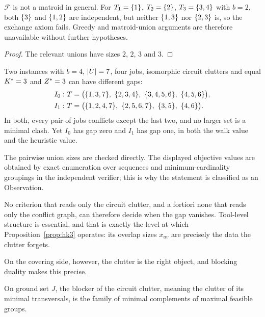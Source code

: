 \begin{proposition}\label{prop:nonmatroid}
$\mathcal{F}$ is not a matroid in general. For $T_1=\{1\}$, $T_2=\{2\}$,
$T_3=\{3,4\}$ with $b=2$, both $\{3\}$ and $\{1,2\}$ are independent, but
neither $\{1,3\}$ nor $\{2,3\}$ is, so the exchange axiom fails. Greedy and
matroid-union arguments are therefore unavailable without further hypotheses.
\end{proposition}

\begin{proof}
The relevant unions have sizes $2$, $2$, $3$ and $3$.
\end{proof}

\begin{observation}\label{obs:noclutter}
Two instances with $b=4$, $\lvert U\rvert=7$, four jobs, isomorphic circuit clutters
and equal $K^{\ast}=3$ and $Z^{\ast}=3$ can have different gaps:
\[
\begin{aligned}
  I_0:\ &T=\bigl(\rset{1,3,7},\ \rset{2,3,4},\ \rset{3,4,5,6},\ \rset{4,5,6}\bigr),\\
  I_1:\ &T=\bigl(\rset{1,2,4,7},\ \rset{2,5,6,7},\ \rset{3,5},\ \rset{4,6}\bigr).
\end{aligned}
\]
In both, every pair of jobs conflicts except the last two, and no larger set is a
minimal clash. Yet $I_0$ has gap zero and $I_1$ has gap one, in both the walk value
and the heuristic value.
\end{observation}

The pairwise union sizes are checked directly. The displayed objective values are
obtained by exact enumeration over sequences and minimum-cardinality groupings in
the independent verifier; this is why the statement is classified as an Observation.

No criterion that reads only the circuit clutter, and a fortiori none that reads only
the conflict graph, can therefore decide when the gap vanishes. Tool-level structure
is essential, and that is exactly the level at which Proposition~\ref{prop:hk3}
operates: its overlap sizes $x_{uv}$ are precisely the data the clutter forgets.

On the covering side, however, the clutter is the right object, and blocking duality
makes this precise.

\begin{proposition}\label{prop:circblocker}
On ground set $J$, the blocker of the circuit clutter, meaning the clutter of its
minimal transversals, is the family of minimal complements of maximal feasible
groups.
\end{proposition}

